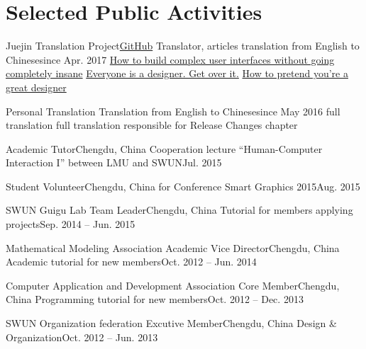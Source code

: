 \section{\textbf{Selected Public Activities}}
  \resumeSubHeadingListStart
    \resumeSubheading
      {Juejin Translation Project}{\href{https://github.com/xitu/gold-miner}{GitHub}}
      {Translator, articles translation from English to Chinese}{since Apr. 2017}
      \resumeItemListStart
          {\href{https://juejin.im/post/5937a61f2f301e006b2879a9}{How to build complex user interfaces without going completely insane}}
          {\href{https://github.com/xitu/gold-miner/pull/1603}{Everyone is a designer. Get over it.}}
          {\href{https://juejin.im/post/5915880b570c35006932fac9}{How to pretend you’re a great designer}}
      \resumeItemListEnd
    
    \resumeSubheading
      {Personal Translation}{}
      {Translation from English to Chinese}{since May 2016}
      \resumeItemListStart
          {full translation}
          {full translation}
          {responsible for Release Changes chapter}
      \resumeItemListEnd

    \resumeSubheading
        {Academic Tutor}{Chengdu, China}
        {Cooperation lecture “Human-Computer Interaction I” between LMU and SWUN}{Jul. 2015}

    \resumeSubheading
        {Student Volunteer}{Chengdu, China}
        {for Conference Smart Graphics 2015}{Aug. 2015}

    \resumeSubheading
        {SWUN Guigu Lab Team Leader}{Chengdu, China}
        {Tutorial for members applying projects}{Sep. 2014 -- Jun. 2015}

    \resumeSubheading
        {Mathematical Modeling Association Academic Vice Director}{Chengdu, China}
        {Academic tutorial for new members}{Oct. 2012 -- Jun. 2014}

    \resumeSubheading
        {Computer Application and Development Association Core Member}{Chengdu, China}
        {Programming tutorial for new members}{Oct. 2012 -- Dec. 2013}

    \resumeSubheading
        {SWUN Organization federation Excutive Member}{Chengdu, China}
        {Design \& Organization}{Oct. 2012 -- Jun. 2013}
  \resumeSubHeadingListEnd